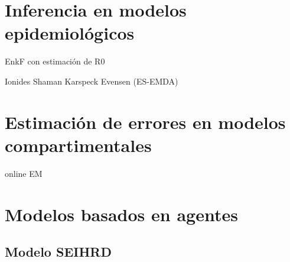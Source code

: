 \section{Inferencia en modelos epidemiológicos}
EnkF con estimación de R0

Ionides Shaman Karspeck Evensen (ES-EMDA)

\section{Estimación de errores en modelos compartimentales}
online EM

\section{Modelos basados en agentes}
\subsection{Modelo SEIHRD}
